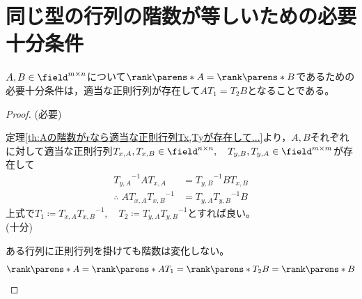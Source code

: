     \section{同じ型の行列の階数が等しいための必要十分条件}
        \begin{shadebox}
            $A,B\in\field^{m\times n}$について$\rank\parens*{A}=\rank\parens*{B}$であるための必要十分条件は，適当な正則行列が存在して$AT_1=T_2B$となることである。
        \end{shadebox}
        \begin{proof}
            (必要)
            \par
            定理\ref{th:Aの階数がrなら適当な正則行列Tx,Tyが存在して...}より，$A,B$それぞれに対して適当な正則行列$T_{x,A},T_{x,B}\in\field^{n\times n},\quad T_{y,B},T_{y,A}\in\field^{m\times m}$が存在して
            \begin{align*}
                {T_{y,A}}^{-1}AT_{x,A} &= {T_{y,B}}^{-1}BT_{x,B}\\
                \therefore\;AT_{x,A}{T_{x,B}}^{-1} &= T_{y,A}{T_{y,B}}^{-1}B
            \end{align*}
            上式で$T_1\coloneq T_{x,A}{T_{x,B}}^{-1},\quad T_2\coloneq T_{y,A}{T_{y,B}}^{-1}$とすれば良い。
            \\
            (十分)
            \par
            ある行列に正則行列を掛けても階数は変化しない。
            \[\rank\parens*{A}=\rank\parens*{AT_1}=\rank\parens*{T_2B}=\rank\parens*{B}\]
        \end{proof}
